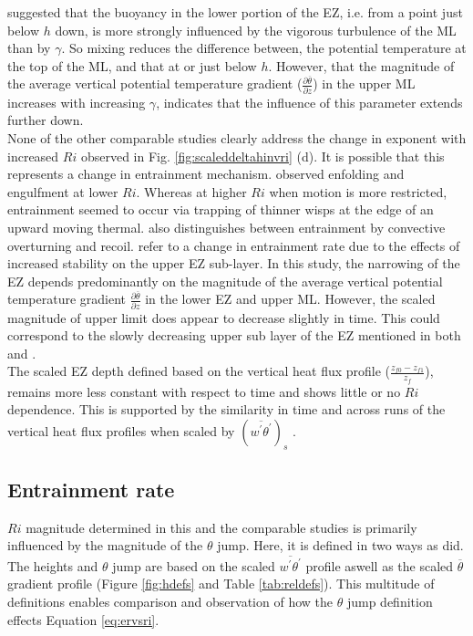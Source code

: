 \cite{GarciaMellado} suggested that the buoyancy in the lower portion of the EZ, i.e. from a point just below $h$ down, is more strongly influenced by the vigorous turbulence of the ML than by $\gamma$.  So mixing reduces the difference between, the potential temperature at the top of the ML, and that at or just below $h$.  However, that the magnitude of the average vertical potential temperature gradient ($\frac{\partial \overline{\theta}}{\partial z}$) in the upper ML increases with increasing $\gamma$, indicates that the influence of this parameter extends further down.\\

None of the other comparable studies clearly address the change in exponent with increased $Ri$ observed in Fig. \ref{fig:scaleddeltahinvri} (d).  It is possible that this represents a change in entrainment mechanism. \cite{SullMoengStev} observed enfolding and engulfment at lower $Ri$.  Whereas at higher $Ri$ when motion is more restricted, entrainment seemed to occur via trapping of thinner wisps at the edge of an upward moving thermal.  \cite{Turner86} also distinguishes between entrainment by convective overturning and recoil. \cite{GarciaMellado} refer to a change in entrainment rate due to the effects of increased stability on the upper EZ sub-layer.  In this study, the narrowing of the EZ depends predominantly on the magnitude of the average vertical potential temperature gradient $\frac{\partial \overline{\theta}}{\partial z}$ in the lower EZ and upper ML.  However, the scaled magnitude of upper limit does appear to decrease slightly in time.  This could correspond to the slowly decreasing upper sub layer of the EZ mentioned in both \cite{GarciaMellado} and \cite{FedConzMir04}.\\

The scaled EZ depth defined based on the vertical heat flux profile ($\frac{z_{f0}-z_{f1}}{z_{f}}$), remains more less constant with respect to time and shows little or no $Ri$ dependence.  This is supported by the similarity in time and across runs of the vertical heat flux profiles when scaled by $(\overline{w^{'}\theta^{'}})_{s}$ \citep{NChap14}.

\subsection{Entrainment rate}

$Ri$ magnitude determined in this and the comparable studies is primarily influenced by the magnitude of the $\theta$ jump.  Here, it is defined in two ways as \cite{FedConzMir04} did.  The heights and $\theta$ jump are based on the scaled $\overline{w^{'}\theta^{'}}$ profile aswell as the scaled $\overline{\theta}$ gradient profile (Figure \ref{fig:hdefs} and Table \ref{tab:reldefs}).  This multitude of definitions enables comparison and observation of how the $\theta$ jump definition effects Equation \ref{eq:ervsri}.

